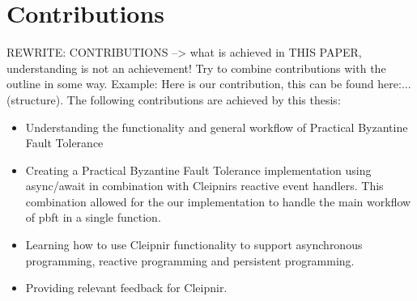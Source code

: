 \section{Contributions}
REWRITE: CONTRIBUTIONS --> what is achieved in THIS PAPER, understanding is not an achievement! Try to combine contributions with the outline in some way. Example: Here is our contribution, this can be found here:... (structure).
The following contributions are achieved by this thesis:
\begin{itemize}
\item Understanding the functionality and general workflow of Practical Byzantine Fault Tolerance
\item Creating a Practical Byzantine Fault Tolerance implementation using async/await in combination with Cleipnirs reactive event handlers. This combination allowed for the our implementation to handle the main workflow of \ac{pbft} in a single function.
\item Learning how to use Cleipnir functionality to support asynchronous programming, reactive programming and persistent programming.
\item Providing relevant feedback for Cleipnir.
\end{itemize}

